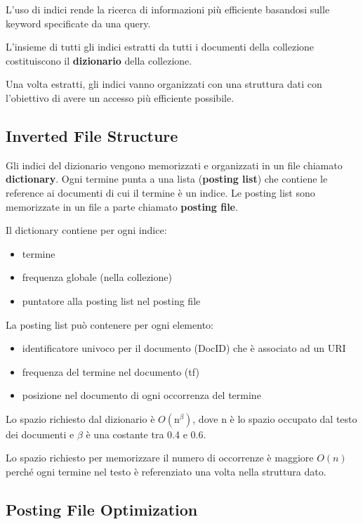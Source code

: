 L'uso di indici rende la ricerca di informazioni più efficiente basandosi sulle keyword specificate da una query.

L'insieme di tutti gli indici estratti da tutti i documenti della collezione costituiscono il \textbf{dizionario} della collezione.

Una volta estratti, gli indici vanno organizzati con una struttura dati con l'obiettivo di avere un accesso più efficiente possibile.

\subsection{Inverted File Structure}
Gli indici del dizionario vengono memorizzati e organizzati in un file chiamato \textbf{dictionary}. Ogni termine
punta a una lista (\textbf{posting list}) che contiene le reference ai documenti di cui il termine è un indice.
Le posting list sono memorizzate in un file a parte chiamato \textbf{posting file}.


Il dictionary contiene per ogni indice:
\begin{itemize}
  \item termine
  \item frequenza globale (nella collezione)
  \item puntatore alla posting list nel posting file
\end{itemize}

La posting list può contenere per ogni elemento:
\begin{itemize}
  \item identificatore univoco per il documento (DocID) che è associato ad un URI
  \item frequenza del termine nel documento (tf)
  \item posizione nel documento di ogni occorrenza del termine
\end{itemize}

Lo spazio richiesto dal dizionario è $O(\text{n}^\beta)$, dove n è lo spazio occupato dal testo dei documenti
e $\beta$ è una costante tra 0.4 e 0.6.

Lo spazio richiesto per memorizzare il numero di occorrenze è maggiore $O(n)$ perché ogni termine nel testo è referenziato
una volta nella struttura dato.

\subsection{Posting File Optimization}

